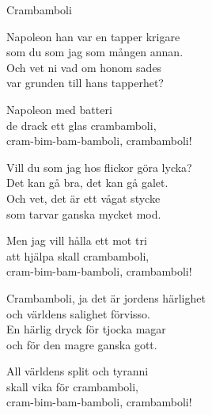 \begin{song}{Crambamboli}

	
	\begin{adjustbox}{center}
	    \begin{minipage}{1.02\textwidth}
        	    \begin{center}
	        \end{center}
        	\end{minipage}
	\end{adjustbox}
	
	\newpage
	
	\showversenumber
	Napoleon han var en tapper krigare\\
	som du som jag som mången annan.\\
	Och vet ni vad om honom sades\\
	var grunden till hans tapperhet?\\
	\begin{repetition}
		Napoleon med batteri\\
		de drack ett glas crambamboli,\\
		cram-bim-bam-bamboli, crambamboli!
	\end{repetition}
	
	\showversenumber
	Vill du som jag hos flickor göra lycka?\\
	Det kan gå bra, det kan gå galet.\\
	Och vet, det är ett vågat stycke\\
	som tarvar ganska mycket mod.\\
	\begin{repetition}
		Men jag vill hålla ett mot tri\\
		att hjälpa skall crambamboli,\\
		cram-bim-bam-bamboli, crambamboli!
	\end{repetition}
	
	\showversenumber
	Crambamboli, ja det är jordens härlighet\\
	och världens salighet förvisso.\\
	En härlig dryck för tjocka magar\\
	och för den magre ganska gott.\\
	\begin{repetition}
		All världens split och tyranni\\
		skall vika för crambamboli,\\
		cram-bim-bam-bamboli, crambamboli!
	\end{repetition}
	
\end{song}
